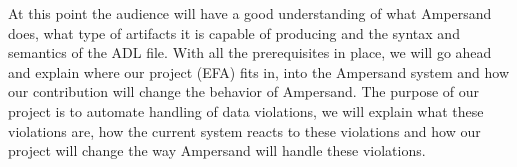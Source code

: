 \documentclass[12pt]{article}
\begin{document}
 At this point the audience will have a good understanding of what Ampersand does, what type of artifacts it is capable of producing and the syntax and semantics of the ADL file. With all the prerequisites in place, we will go ahead and explain where our project (EFA) fits in, into the Ampersand system and how our contribution will change the behavior of Ampersand. The purpose of our project is to automate handling of data violations, we will explain what these violations are, how the current system reacts to these violations and how our project will change the way Ampersand will handle these violations.
 
% 
 
\end{document}

